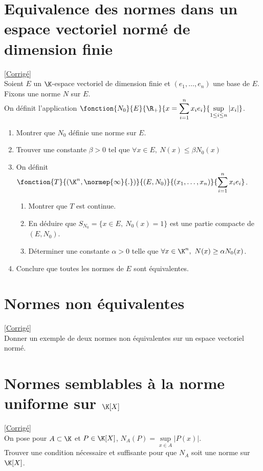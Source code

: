 \documentclass{book}
\begin{document}
	\section{Equivalence des normes dans un espace vectoriel normé de dimension finie}
	\textcolor{blue}{\hyperref[sec:equivalence-des-normes-dans-un-espace-vectoriel-norme-de-dimension-finie]{[Corrigé]}}\\
	\label{Equivalence des normes dans un espace vectoriel normée de dimension finie}
	Soient $E$ un $\K$-espace vectoriel de dimension finie et $(e_1,\dots,e_n)$ une base de $E$. Fixons une norme $N$ sur $E$.\\
	On définit l'application $\fonction{N_0}{E}{\R_+}{x=\displaystyle\sum_{i=1}^nx_ie_i}{\sup\limits_{1\leq i\leq n}{|x_i|}}$.
	\begin{enumerate}
		\item Montrer que $N_0$ définie une norme sur $E$.
		\item Trouver une constante $\beta>0$ tel que $\forall x\in E,\ N(x)\leq \beta N_0(x)$
		\item On définit $\fonction{T}{(\K^n,\normep{\infty}{.})}{(E,N_0)}{(x_1,\dots,x_n)}{\displaystyle\sum_{i=1}^nx_ie_i}$.
		\begin{enumerate}[label=\alph*.]
			\item Montrer que $T$ est continue.
			\item En déduire que $S_{N_0}=\{x\in E,\ N_0(x)=1\}$ est une partie compacte de $(E,N_0)$.
			\item Déterminer une constante $\alpha>0$ telle que $\forall x\in \K^n,\ N(x)\geq \alpha N_0(x)$.
		\end{enumerate}
		\item Conclure que toutes les normes de $E$ sont équivalentes.
	\end{enumerate}
	
	\section{Normes non équivalentes}
	\textcolor{blue}{\hyperref[sec:normes-non-equivalentes]{[Corrigé]}}\\
	\label{Normes non équivalentes}
	Donner un exemple de deux normes non équivalentes sur un espace vectoriel normé.
	
	\section{Normes semblables à la norme uniforme sur $\K[X]$}
	\textcolor{blue}{\hyperref[sec:normes-semblables-a-la-norme-uniforme-sur-kx]{[Corrigé]}}\\
	\label{Normes semblables à la norme uniforme sur KX}
	On pose pour $A\subset \K$ et $P\in \K[X]$, $N_A(P)=\sup\limits_{x\in A}|P(x)|$.\\
	Trouver une condition nécessaire et suffisante pour que $N_A$ soit une norme sur $\K[X]$.
	
\end{document}
